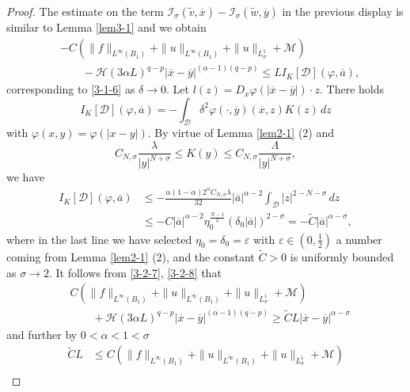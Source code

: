 \documentclass[10pt,a4paper]{amsart}
\begin{document}
\begin{proof}
The estimate on the term $\mathcal{I}_\sigma(\widetilde{v},\overline{x})-\mathcal{I}_\sigma(\widetilde{w},\overline{y})$ in the previous display is similar to Lemma \ref{lem3-1}
and we obtain
\begin{equation}
\label{3-2-7}
\begin{split}
&-C(\|f\|_{L^\infty(B_1)}+\|u\|_{L^\infty(B_1)}+\|u\|_{L^1_\sigma}+\mathcal{M})\\
&\qquad-\mathcal{H}(3\alpha L)^{q-p}|\overline{x}-\overline{y}|^{(\alpha-1)(q-p)}\le LI_K[\mathcal{D}](\varphi,\overline{a}),
\end{split}
\end{equation}
corresponding to \eqref{3-1-6} as $\delta\rightarrow0$.
Let $l(z)=D_x\varphi(|\overline{x}-\overline{y}|)\cdot z$. There holds
$$
I_K[\mathcal{D}](\varphi,\overline{a})=-\int_{\mathcal{D}}\delta^2\varphi(\cdot,\overline{y})(\overline{x},z)K(z)\,dz
$$
with $\varphi(x,y)=\varphi(|x-y|)$. By virtue of Lemma \ref{lem2-1} (2) and
$$
C_{N,\sigma}\frac{\lambda}{|y|^{N+\sigma}}\le K(y)\le C_{N,\sigma}\frac{\Lambda}{|y|^{N+\sigma}},
$$
we have
\begin{equation}
\label{3-2-8}
\begin{split}
I_K[\mathcal{D}](\varphi,\overline{a})&\le-\frac{\alpha(1-\alpha)2^\alpha C_{N,\sigma}\lambda}{32}|\overline{a}|^{\alpha-2}\int_{\mathcal{D}}
|z|^{2-N-\sigma}\,dz \\
&\le-C|\overline{a}|^{\alpha-2}\eta_0^{\frac{N-1}{2}}(\delta_0|\overline{a}|)^{2-\sigma}
=-\widetilde{C}|\overline{a}|^{\alpha-\sigma},
\end{split}
\end{equation}
where in the last line we have selected $\eta_0=\delta_0=\varepsilon$ with $\varepsilon\in(0,\frac{1}{2})$ a number coming from Lemma \ref{lem2-1} (2), and the constant $\widetilde{C}>0$ is uniformly bounded as $\sigma\rightarrow2$. It follows from \eqref{3-2-7}, \eqref{3-2-8} that
\[
\begin{split}
&C(\|f\|_{L^\infty(B_1)}+\|u\|_{L^\infty(B_1)}+\|u\|_{L^1_\sigma}+\mathcal{M})\\
&\qquad+\mathcal{H}(3\alpha L)^{q-p}|\overline{x}-\overline{y}|^{(\alpha-1)(q-p)}\ge\widetilde{C}L|\overline{x}-\overline{y}|^{\alpha-\sigma}
\end{split}
\]
and further by $0<\alpha<1<\sigma$
\begin{equation}
\label{3-2-9}
\begin{split}
\widetilde{C}L&\le C(\|f\|_{L^\infty(B_1)}+\|u\|_{L^\infty(B_1)}+\|u\|_{L^1_\sigma}+\mathcal{M})\\

\end{split}
\end{equation}
\end{proof}
\end{document}
